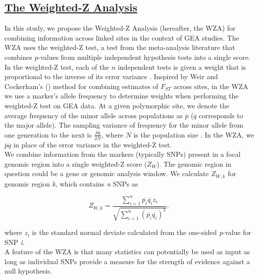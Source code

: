 \documentclass[10pt,twoside,lineno]{GSA_format}
\begin{document}

\subsection{\underline{The Weighted-Z Analysis}} 

In this study, we propose the Weighted-Z Analysis (hereafter, the WZA) for combining information across linked sites in the context of GEA studies. The WZA uses the weighted-Z test, a test from the meta-analysis literature that combines \textit{p}-values from multiple independent hypothesis tests into a single score. In the weighted-Z test, each of the $n$ independent tests is given a weight that is proportional to the inverse of its error variance \citep{WHITLOCK2005}. Inspired by Weir and Cockerham's (\citeyear{Weir1984-tc}) method for combining estimates of $F_{ST}$ across sites, in the WZA we use a marker's allele frequency to determine weights when performing the weighted-Z test on GEA data. At a given polymorphic site, we denote the average frequency of the minor allele across populations as $\overline{p}$ ($\overline{q}$ corresponds to the major allele). The sampling variance of frequency for the minor allele from one generation to the next is $\frac{\overline{p}\overline{q}}{2N}$, where $N$ is the population size \citep{RN173}.  In the WZA, we $\overline{p}\overline{q}$ in place of the error variance in the weighted-Z test. \\

We combine information from the markers (typically SNPs) present in a focal genomic region into a single weighted-Z score ($Z_W$). The genomic region in question could be a gene or genomic analysis window. We calculate $Z_{W,k}$ for genomic region \textit{k}, which contains \textit{n} SNPs as

\begin{equation}
\label{weightedZ}
Z_{W,k} =  \frac {\sum\limits_{i=1}^n \overline{p_i} \overline{q_i}z_i}{\sqrt{ \sum\limits_{i=1}^n (\overline{p_i}\overline{q_i})^2} },
\end{equation}

\noindent where $z_i$ is the standard normal deviate calculated from the one-sided \textit{p}-value for SNP \textit{i}. \\

A feature of the WZA is that many statistics can potentially be used as input as long as individual SNPs provide a measure for the strength of evidence against a null hypothesis. \\
\end{document}
